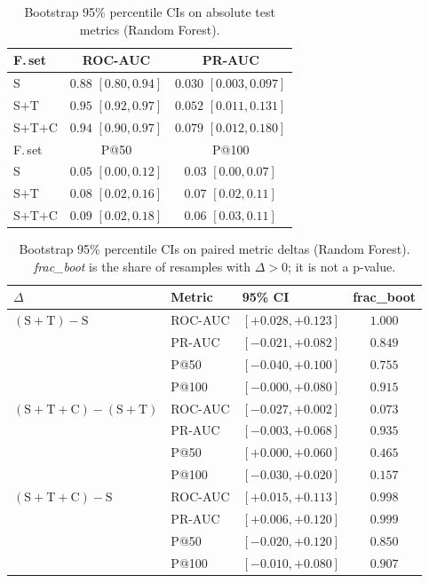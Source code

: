 \documentclass[conference]{IEEEtran}
\begin{document}
\begin{table}[t]
\caption{Bootstrap 95\% percentile CIs on absolute test metrics
(Random Forest).}
\label{tab:boot_abs}
\centering
\small
\begin{tabular}{lcc}
\toprule
F.\,set & ROC-AUC & PR-AUC \\
\midrule
S        & $0.88$ $[0.80, 0.94]$ & $0.030$ $[0.003, 0.097]$ \\
S$+$T    & $0.95$ $[0.92, 0.97]$ & $0.052$ $[0.011, 0.131]$ \\
S$+$T$+$C & $0.94$ $[0.90, 0.97]$ & $0.079$ $[0.012, 0.180]$ \\
\midrule
F.\,set & P@50 & P@100 \\
\midrule
S        & $0.05$ $[0.00, 0.12]$ & $0.03$ $[0.00, 0.07]$ \\
S$+$T    & $0.08$ $[0.02, 0.16]$ & $0.07$ $[0.02, 0.11]$ \\
S$+$T$+$C & $0.09$ $[0.02, 0.18]$ & $0.06$ $[0.03, 0.11]$ \\
\bottomrule
\end{tabular}
\end{table}

\begin{table}[t]
\caption{Bootstrap 95\% percentile CIs on paired metric deltas
(Random Forest). \emph{frac\_boot} is the share of resamples with
$\Delta > 0$; it is not a p-value.}
\label{tab:boot_delta}
\centering
\small
\begin{tabular}{lllc}
\toprule
$\Delta$ & Metric & 95\% CI & frac\_boot \\
\midrule
$(\mathrm{S}{+}\mathrm{T}) - \mathrm{S}$
  & ROC-AUC & $[+0.028, +0.123]$ & $1.000$ \\
  & PR-AUC  & $[-0.021, +0.082]$ & $0.849$ \\
  & P@50    & $[-0.040, +0.100]$ & $0.755$ \\
  & P@100   & $[-0.000, +0.080]$ & $0.915$ \\
\addlinespace
$(\mathrm{S}{+}\mathrm{T}{+}\mathrm{C}) - (\mathrm{S}{+}\mathrm{T})$
  & ROC-AUC & $[-0.027, +0.002]$ & $0.073$ \\
  & PR-AUC  & $[-0.003, +0.068]$ & $0.935$ \\
  & P@50    & $[+0.000, +0.060]$ & $0.465$ \\
  & P@100   & $[-0.030, +0.020]$ & $0.157$ \\
\addlinespace
$(\mathrm{S}{+}\mathrm{T}{+}\mathrm{C}) - \mathrm{S}$
  & ROC-AUC & $[+0.015, +0.113]$ & $0.998$ \\
  & PR-AUC  & $[+0.006, +0.120]$ & $0.999$ \\
  & P@50    & $[-0.020, +0.120]$ & $0.850$ \\
  & P@100   & $[-0.010, +0.080]$ & $0.907$ \\
\bottomrule
\end{tabular}
\end{table}
\end{document}
